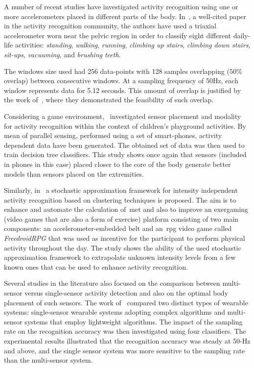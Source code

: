 A number of recent studies have investigated activity recognition using one or more accelerometers placed in different parts of the body. In~\cite{ravi_activity_2005}, a well-cited paper in the activity recognition community, the authors have used a triaxial accelerometer worn near the pelvic region in order to classify eight different daily-life activities: \textit{standing}, \textit{walking}, \textit{running}, \textit{climbing up stairs}, \textit{climbing down stairs}, \textit{sit-ups}, \textit{vacuuming}, and \textit{brushing teeth}.

The windows size used had 256 data-points with 128 samples overlapping ($50\%$ overlap) between consecutive windows. At a sampling frequency of 50Hz, each window represents data for 5.12 seconds. This amount of overlap is justified by the work of~\cite{bao_activity_2004}, where they demonstrated the feasibility of such overlap. %

Considering a game environment,~\cite{jablonsky_evaluating_2017} investigated sensor placement and modality for activity recognition within the context of children's playground  activities. By mean of parallel sensing, performed using a set of smart-phones, activity dependent data have been generated. The obtained set of data was then used to train decision tree classifiers. This study shows once again that sensors (included in phones in this case) placed closer to the core of the body generate better models than sensors placed on the  extremities. 

Similarly, in~\cite{alshurafa_designing_2014} a stochastic approximation framework for intensity independent activity recognition based on clustering techniques is proposed. The aim is to enhance and automate the calculation of~\gls{met} and also to improve an exergaming (video games that are also a form of exercise) platform consisting of two main components: an accelerometer-embedded belt and an~\gls{rpg} video game called \textit{FreedroidRPG} that was used as incentive for the participant to perform physical activity throughout the day. The study shows the ability of the used stochastic approximation framework to extrapolate unknown intensity levels from a few known ones that can be used to enhance activity recognition.

Several studies in the literature also focused on the comparison between multi-sensor versus single-sensor activity detection and also on the optimal body placement of such sensors. The work of~\cite{gao_evaluation_2014} compared two distinct types of wearable systems: single-sensor wearable systems adopting complex algorithms and multi-sensor systems that employ lightweight algorithms. The impact of the sampling rate on the recognition accuracy was then investigated using four classifiers. The experimental results illustrated that the recognition accuracy was steady at 50-Hz and above, and the single sensor system was more sensitive to the sampling rate than the multi-sensor system.

